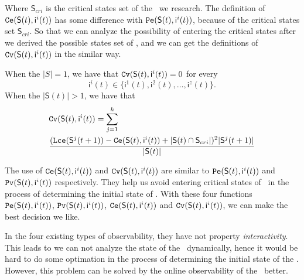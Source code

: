 Where $\mathsf{S}_{cri}$ is the critical states set of the \BCN\ we research. The definition of ${\tt Ce}(\mathsf{S}(t), \mathsf{ i}^{i}(t))$ has some difference with ${\tt Pe}(\mathsf{S}(t), \mathsf{ i}^{i}(t))$, because of the critical states set $\mathsf{S}_{cri}$. So that we can analyze the possibility of entering the critical states after we derived the possible states set of \BCNs, and we can get the definitions of ${\tt Cv}(\mathsf{S}(t), \mathsf{ i}^{i}(t))$ in the similar way. %

\begin{definition} 
When the $|S|=1$, we have that
${\tt Cv}(\mathsf{S}(t), \mathsf{ i}^{i}(t))=0$ for every  \[\mathsf{ i}^{i}(t) \in \{\mathsf{ i}^{1}(t),\mathsf{ i}^{2}(t),\ldots, \mathsf{ i}^{z}(t)\}.\]   When the $|\mathsf{S}(t)|>1$, 
we have that  \\
\begin{equation}
\begin{split}
&{\tt Cv}(\mathsf{S}(t), \mathsf{ i}^{i}(t))=\sum_{j=1}^k\\
&\frac{ ({\tt Lce}(\mathsf{S}^{j}(t+1))-{\tt Ce}(\mathsf{S}(t), \mathsf{ i}^{i}(t))+|\mathsf{S}(t) \cap \mathsf{S}_{cri}|)^2 |\mathsf{S}^{j}(t+1)|}{ |\mathsf{S}(t)|}
\end{split}
\end{equation}
\end{definition}

The use of ${\tt Ce}(\mathsf{S}(t), \mathsf{ i}^{i}(t))$ and ${\tt Cv}(\mathsf{S}(t), \mathsf{ i}^{i}(t))$ are similar to ${\tt Pe}(\mathsf{S}(t), \mathsf{ i}^{i}(t))$ and ${\tt Pv}(\mathsf{S}(t), \mathsf{ i}^{i}(t))$ respectively. They help us avoid entering critical states of \BCNs\ in the process of determining the initial state of \BCNs. With these four functions ${\tt Pe}(\mathsf{S}(t), \mathsf{ i}^{i}(t))$, ${\tt Pv}(\mathsf{S}(t), \mathsf{ i}^{i}(t))$, ${\tt Ce}(\mathsf{S}(t), \mathsf{ i}^{i}(t))$ and ${\tt Cv}(\mathsf{S}(t), \mathsf{ i}^{i}(t))$, we can make the best decision we like. 

In the four existing types of observability, they have not property {\em interactivity}. This leads to we can not analyze the state of the \BCNs\ dynamically, hence it would be hard to do some optimation in the process of determining the initial state of the \BCNs. However, this problem can be solved by the online observability of the \BCNs\ better.